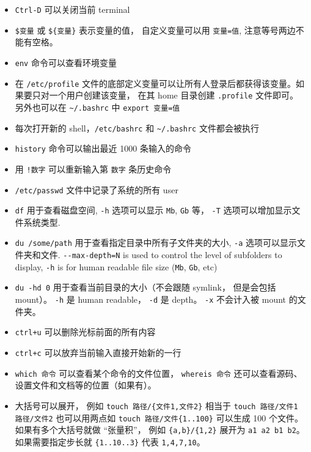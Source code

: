 \begin{itemize}
\item \verb`Ctrl-D` 可以关闭当前 terminal
\item \verb`$变量` 或 \verb|${变量}| 表示变量的值， 自定义变量可以用 \verb`变量=值`, 注意等号两边不能有空格。
\item \verb`env` 命令可以查看环境变量
\item 在 \verb`/etc/profile` 文件的底部定义变量可以让所有人登录后都获得该变量。如果要只对一个用户创建该变量， 在其 home 目录创建 \verb|.profile| 文件即可。 另外也可以在 \verb|~/.bashrc| 中 \verb|export 变量=值|
\item 每次打开新的 shell，\verb`/etc/bashrc` 和 \verb`~/.bashrc` 文件都会被执行
\item \verb|history| 命令可以输出最近 1000 条输入的命令
\item 用 \verb`!数字` 可以重新输入第 \verb`数字` 条历史命令
\item \verb`/etc/passwd` 文件中记录了系统的所有 user
\item \verb`df` 用于查看磁盘空间, \verb`-h` 选项可以显示 \verb`Mb`, \verb`Gb` 等， \verb|-T| 选项可以增加显示文件系统类型.
\item \verb`du /some/path` 用于查看指定目录中所有子文件夹的大小, \verb`-a` 选项可以显示文件夹和文件. \verb`--max-depth=N` is used to control the level of subfolders to display, \verb`-h` is for human readable file size (\verb`Mb`, \verb`Gb`, etc)
\item \verb|du -hd 0| 用于查看当前目录的大小（不会跟随 symlink， 但是会包括 mount）。 \verb|-h| 是 human readable， \verb|-d| 是 depth。 \verb|-x| 不会计入被 mount 的文件夹。
\item \verb`ctrl+u` 可以删除光标前面的所有内容
\item \verb`ctrl+c` 可以放弃当前输入直接开始新的一行
\item \verb|which 命令| 可以查看某个命令的文件位置， \verb|whereis 命令| 还可以查看源码、设置文件和文档等的位置（如果有）。
\item 大括号可以展开， 例如 \verb|touch 路径/{文件1,文件2}| 相当于 \verb|touch 路径/文件1 路径/文件2| 也可以用两点如 \verb|touch 路径/文件{1..100}| 可以生成 100 个文件。 如果有多个大括号就做 “张量积”， 例如 \verb|{a,b}/{1,2}| 展开为 \verb|a1 a2 b1 b2|。 如果需要指定步长就 \verb|{1..10..3}| 代表 \verb|1,4,7,10|。
\end{itemize}

